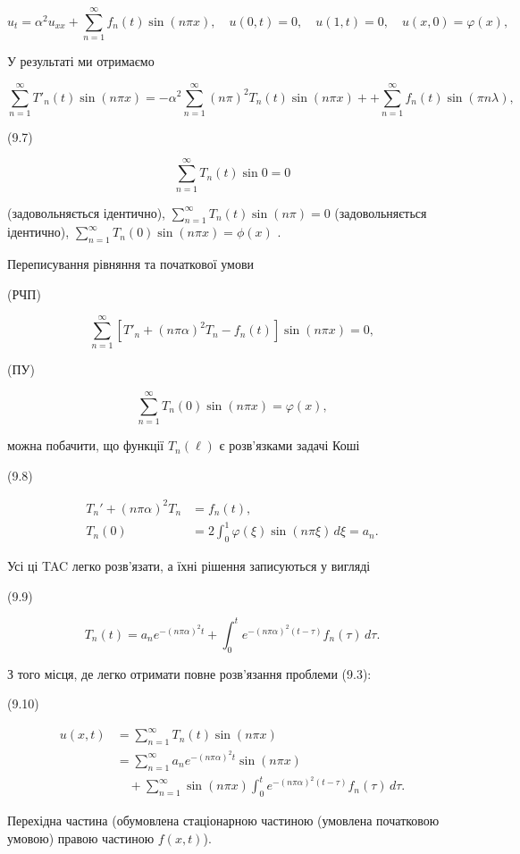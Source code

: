 \documentclass[
  ukrainian,
]{article}
\begin{document}
\[
u_{t} = \alpha^{2} u_{xx} + \sum_{n=1}^{\infty} f_{n}(t) \sin(n\pi x),
\quad u(0, t) = 0, \quad u(1, t) = 0, \quad u(x, 0) = \varphi(x),
\]

У результаті ми отримаємо

\[
\sum_{n=1}^{\infty} T'_n(t) \sin(n\pi x) = -\alpha^2 \sum_{n=1}^{\infty} (n\pi)^2 T_n(t) \sin(n\pi x) + + \sum_{n=1}^{\infty} f_n(t) \sin(\pi n\lambda),
\]

(9.7)

\[
\sum_{n=1}^{\infty} T_n(t) \sin 0 = 0
\]

(задовольняється ідентично),
\(\sum_{n=1}^{\infty} T_n(t) \sin (n\pi) = 0\) (задовольняється
ідентично), \(\sum_{n=1}^{\infty} T_n(0) \sin (n\pi x) = \phi(x)\) .

Переписування рівняння та початкової умови

(РЧП)

\[
\sum_{n=1}^{\infty} [T'_n + (n\pi\alpha)^2 T_n - f_n(t)] \sin(n\pi x) = 0,
\]

(ПУ)

\[
\sum_{n=1}^{\infty} T_n(0) \sin(n\pi x) = \varphi(x),
\]

можна побачити, що функції \(T_n(\ell)\) є розв'язками задачі Коші

(9.8)

\[
\begin{aligned}
T_n' + (n\pi\alpha)^2 T_n &= f_n(t), \\
T_n(0) &= 2 \int_0^1 \varphi(\xi)\sin(n\pi \xi)\,d\xi = a_n.
\end{aligned}
\]

Усі ці TAC легко розв'язати, а їхні рішення записуються у вигляді

(9.9)

\[
T_n(t) = a_n e^{-(n\pi\alpha)^2 t} + \int_0^t e^{-(n\pi\alpha)^2 (t-\tau)} f_n(\tau)\,d\tau.
\]

З того місця, де легко отримати повне розв'язання проблеми (9.3):

(9.10)

\[
\begin{aligned}
u(x, t) &= \sum_{n=1}^{\infty} T_n(t)\sin(n\pi x) \\
&= \sum_{n=1}^{\infty} a_n e^{-(n\pi\alpha)^2 t}\sin(n\pi x) \\
&\quad + \sum_{n=1}^{\infty} \sin(n\pi x)\int_0^t e^{-(n\pi\alpha)^2 (t-\tau)} f_n(\tau)\,d\tau.
\end{aligned}
\]

Перехідна частина (обумовлена стаціонарною частиною (умовлена початковою
умовою) правою частиною \(f(x, t)\)).
\end{document}
